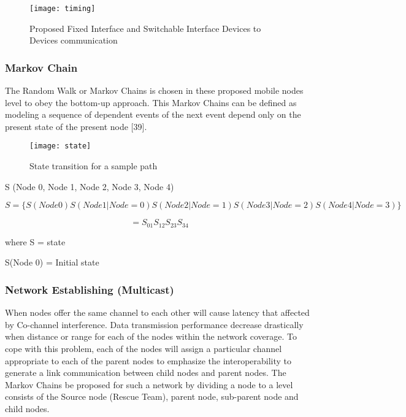 \documentclass{article}
\begin{document}
\newpage
\begin{center}
\begin{figure}[t]
\texttt{[image: timing]}
\caption{Proposed Fixed Interface and Switchable Interface Devices to Devices communication}\label{timing}
\end{figure}
\end{center}

\subsubsection{Markov Chain}

The Random Walk or Markov Chains is chosen in these proposed mobile nodes level to obey the bottom-up approach. This Markov Chains can be defined as modeling a sequence of dependent events of the next event depend only on the present state of the present node [39].

\begin{center}
\begin{figure}[h]
\texttt{[image: state]}
\caption{State transition for a sample path}\label{state}
\end{figure}
\end{center}

S (Node 0, Node 1, Node 2, Node 3, Node 4)

\begin{equation}
 S= \{S (Node 0) S (Node 1 \vert Node= 0) S (Node 2\vert Node= 1) S (Node 3\vert Node= 2) S (Node 4\vert Node= 3)\}
\end{equation}

\begin{equation*}
=S_{01}S_{12}S_{23}S_{34}  
\end{equation*}

where S = state

S(Node 0) = Initial state
                                                                
\subsubsection{Network Establishing (Multicast)}

When nodes offer the same channel to each other will cause latency that affected by Co-channel interference. Data transmission performance decrease drastically when distance or range for each of the nodes within the network coverage. To cope with this problem, each of the nodes will assign a particular channel appropriate to each of the parent nodes to emphasize the interoperability to generate a link communication between child nodes and parent nodes. The Markov Chains be proposed for such a network by dividing a node to a level consists of the Source node (Rescue Team), parent node, sub-parent node and child nodes. 
\end{document}
